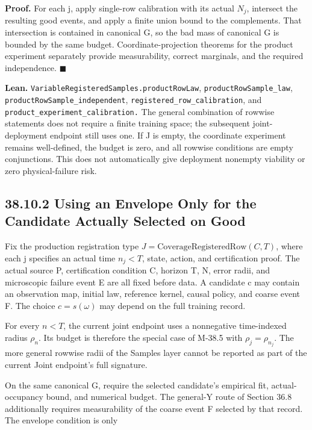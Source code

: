 \documentclass[
  english,
  11pt,
  oneside]{book}
\newcounter{none} %
\begin{document}
\textbf{Proof.} For each j, apply single-row calibration with its actual \(N_j\), intersect the resulting good events, and apply a finite union bound to the complements. That intersection is contained in canonical G, so the bad mass of canonical G is bounded by the same budget. Coordinate-projection theorems for the product experiment separately provide measurability, correct marginals, and the required independence. \(\blacksquare\)

\textbf{Lean.} \nolinkurl{VariableRegisteredSamples.productRowLaw}, \nolinkurl{productRowSample_law}, \nolinkurl{productRowSample_independent}, \nolinkurl{registered_row_calibration}, and \nolinkurl{product_experiment_calibration.} The general combination of rowwise statements does not require a finite training space; the subsequent joint-deployment endpoint still uses one. If J is empty, the coordinate experiment remains well-defined, the budget is zero, and all rowwise conditions are empty conjunctions. This does not automatically give deployment nonempty viability or zero physical-failure risk.

\subsection{38.10.2 Using an Envelope Only for the Candidate Actually Selected on Good}\label{using-an-envelope-only-for-the-candidate-actually-selected-on-good}

Fix the production registration type \(J=\mathrm{CoverageRegisteredRow}(C,T)\), where each j specifies an actual time \(n_j<T\), state, action, and certification proof. The actual source P, certification condition C, horizon T, N, error radii, and microscopic failure event E are all fixed before data. A candidate c may contain an observation map, initial law, reference kernel, causal policy, and coarse event F. The choice \(c=s(\omega)\) may depend on the full training record.

For every \(n<T\), the current joint endpoint uses a nonnegative time-indexed radius \(\rho_n\). Its budget is therefore the special case of M-38.5 with \(\rho_j=\rho_{n_j}\). The more general rowwise radii of the Samples layer cannot be reported as part of the current Joint endpoint's full signature.

On the same canonical G, require the selected candidate's empirical fit, actual-occupancy bound, and numerical budget. The general-Y route of Section 36.8 additionally requires measurability of the coarse event F selected by that record. The envelope condition is only
\end{document}
